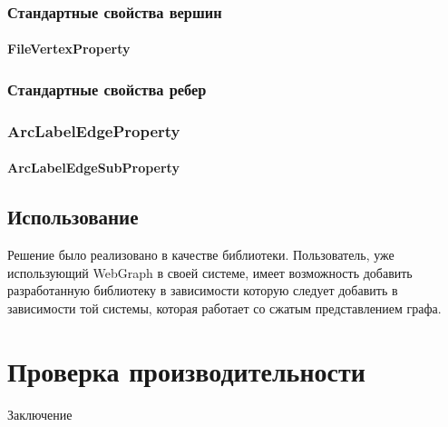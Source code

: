 \documentclass[times,specification,annotation]{itmo-student-thesis}
\begin{document}
\subsection{Стандартные свойства вершин}

\subsubsection{FileVertexProperty}

\subsection{Стандартные свойства ребер}

\subsection{ArcLabelEdgeProperty}

\subsubsection{ArcLabelEdgeSubProperty}

\section{Использование}
Решение было реализовано в качестве библиотеки. Пользователь, уже использующий WebGraph в своей системе, имеет возможность добавить разработанную библиотеку в зависимости которую следует добавить в зависимости той системы, которая работает со сжатым представлением графа.

\chapterconclusion

\chapter{Проверка производительности}

\chapterconclusion

\startconclusionpage

Заключение

\printmainbibliography
\end{document}
